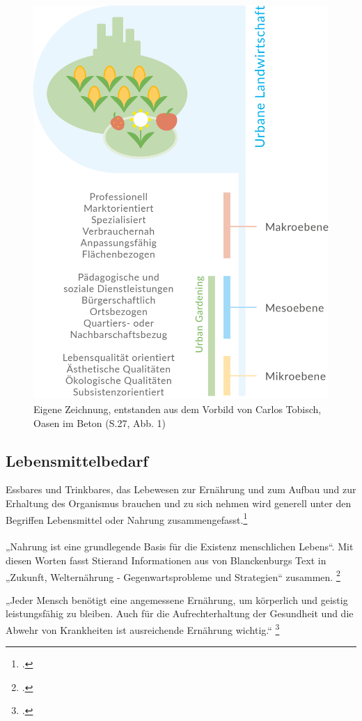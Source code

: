 \documentclass{scrartcl}
\begin{document}
\begin{figure}[htbp]
\centering
\includegraphics[width=12cm]{image_folder/SchaubildULvsUG.png}
\caption{Eigene Zeichnung, entstanden aus dem Vorbild von Carlos Tobisch, Oasen im Beton (S.27, Abb. 1)}
\label{fig:ul_typologie}
\end{figure}

\subsection{Lebensmittelbedarf}

Essbares und Trinkbares, das Lebewesen zur Ernährung und zum Aufbau und zur Erhaltung des Organismus brauchen und zu sich nehmen wird generell unter den Begriffen Lebensmittel oder Nahrung zusammengefasst.\footcite{DudenLebensmittel}\\
\\
„Nahrung ist eine grundlegende Basis für die Existenz menschlichen Lebens“. Mit diesen Worten fasst Stierand Informationen aus von Blanckenburgs Text in „Zukunft, Welternährung - Gegenwartsprobleme und Strategien“ zusammen. \footcite[S.122f]{Stierand2008StadtLebensmittel} 
\begin{displayquote}
„Jeder Mensch benötigt eine angemessene Ernährung, um körperlich und geistig leistungsfähig zu bleiben. Auch für die Aufrechterhaltung der Gesundheit und die Abwehr von Krankheiten ist ausreichende Ernährung wichtig.“ \footcite{Blanckenburg1987ZukunftDie}
\end{displayquote}
\end{document}
